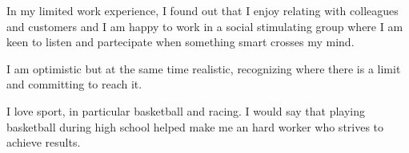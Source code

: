 \documentclass[english,a4paper, nologo, notitle]{myeuropasscv}
\begin{document}
\begin{europasscv}
{  In my limited work experience, I found out that I enjoy relating with colleagues and customers
  and I am happy to work in a social stimulating group where I am keen to listen and partecipate
  when something smart crosses my mind.
  
  I am optimistic but at the same time realistic, recognizing where there is a limit and committing
  to reach it.  
  
  I love sport, in particular basketball and racing. I would say that playing basketball during high school helped make me an hard
  worker who strives to achieve results.}

  
  
  \vfill
  
  
  \end{europasscv}
\end{document}
